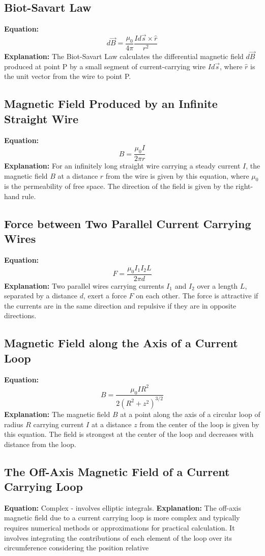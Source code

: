 \documentclass{article}
\begin{document}
\subsection*{Biot-Savart Law}
\textbf{Equation:} 
\[ d\vec{B} = \frac{\mu_0}{4\pi} \frac{Id\vec{s} \times \hat{r}}{r^2} \]
\textbf{Explanation:} 
The Biot-Savart Law calculates the differential magnetic field \( d\vec{B} \) produced at point P by a small segment of current-carrying wire \( Id\vec{s} \), where \( \hat{r} \) is the unit vector from the wire to point P.
\subsection*{Magnetic Field Produced by an Infinite Straight Wire}
\textbf{Equation:} 
\[ B = \frac{\mu_0 I}{2\pi r} \]
\textbf{Explanation:} 
For an infinitely long straight wire carrying a steady current \(I\), the magnetic field \(B\) at a distance \(r\) from the wire is given by this equation, where \(\mu_0\) is the permeability of free space. The direction of the field is given by the right-hand rule.

\subsection*{Force between Two Parallel Current Carrying Wires}
\textbf{Equation:} 
\[ F = \frac{\mu_0 I_1 I_2 L}{2\pi d} \]
\textbf{Explanation:} 
Two parallel wires carrying currents \(I_1\) and \(I_2\) over a length \(L\), separated by a distance \(d\), exert a force \(F\) on each other. The force is attractive if the currents are in the same direction and repulsive if they are in opposite directions.

\subsection*{Magnetic Field along the Axis of a Current Loop}
\textbf{Equation:} 
\[ B = \frac{\mu_0 I R^2}{2(R^2 + z^2)^{3/2}} \]
\textbf{Explanation:} 
The magnetic field \(B\) at a point along the axis of a circular loop of radius \(R\) carrying current \(I\) at a distance \(z\) from the center of the loop is given by this equation. The field is strongest at the center of the loop and decreases with distance from the loop.

\subsection*{The Off-Axis Magnetic Field of a Current Carrying Loop}
\textbf{Equation:} 
Complex - involves elliptic integrals.
\textbf{Explanation:} 
The off-axis magnetic field due to a current carrying loop is more complex and typically requires numerical methods or approximations for practical calculation. It involves integrating the contributions of each element of the loop over its circumference considering the position relative
\end{document}
